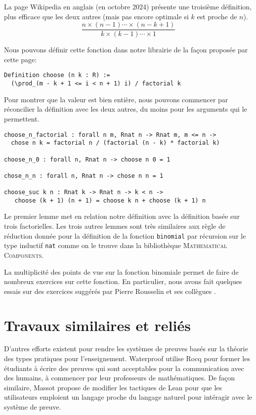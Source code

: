 \documentclass{jflart}
\newcommand{\mathcomp}{\textsc{Mathematical Components}}
\begin{document}
La page Wikipedia en anglais (en octobre 2024) présente une troisième
définition, plus
efficace que les deux autres (mais pas encore optimale si \(k\) est proche
de \(n\)).
\[\frac{n \times (n - 1) \cdots \times (n - k + 1)}
{k \times (k - 1) \cdots \times 1}\]

Nous pouvons définir cette fonction dans notre librairie de la façon
proposée par cette page:
\begin{verbatim}
Definition choose (n k : R) :=
  (\prod_(m - k + 1 <= i < n + 1) i) / factorial k
\end{verbatim}

Pour montrer que la valeur est bien entière, nous pouvons commencer
par réconcilier la définition avec les deux autres, du moins pour les
arguments qui le permettent.
\begin{verbatim}
choose_n_factorial : forall n m, Rnat n -> Rnat m, m <= n -> 
  chose n k = factorial n / (factorial (n - k) * factorial k)

choose_n_0 : forall n, Rnat n -> choose n 0 = 1

chose_n_n : forall n, Rnat n -> chose n n = 1

choose_suc k n : Rnat k -> Rnat n -> k < n ->
   choose (k + 1) (n + 1) = choose k n + choose (k + 1) n
\end{verbatim}
Le premier lemme met en relation notre définition avec
la définition basée sur trois factorielles.  Les trois autres
lemmes sont très similaires aux règle de réduction donnée pour
la définition de la fonction \texttt{binomial} par récursion sur le type
inductif \texttt{nat} comme on le trouve dans la bibliothèque
\mathcomp{}.

La multiplicité des points de vue sur la fonction binomiale permet de
faire de nombreux exercices sur cette fonction.  En particulier, nous
avons fait quelques essais sur des exercices suggérés par Pierre
Rousselin et ses collègues \cite{RousselinPF24}.
\section{Travaux similaires et reliés}
D'autres efforts existent pour rendre les systèmes de preuves basés
sur la théorie des types pratiques pour l'enseignement.  Waterproof
\cite{Wemmenhove_2024}
utilise Rocq pour former les étudiants à écrire des preuves qui sont
acceptables pour la communication avec des humains, à commencer par
leur professeurs de mathématiques.  De façon similaire, Massot
\cite{massot:LIPIcs.ITP.2024.27}
propose
de modifier les tactiques de Lean pour que les utilisateurs emploient
un langage proche du langage naturel pour intéragir avec le système de
preuve.
\end{document}
